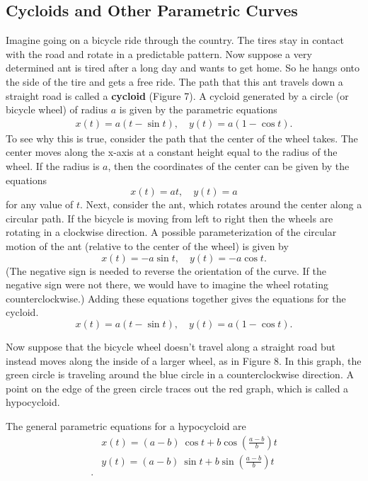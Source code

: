 \documentclass{report}
\begin{document}
    \subsection{Cycloids and Other Parametric Curves}
    \bigbreak \noindent 
    Imagine going on a bicycle ride through the country. The tires stay in contact with the road and rotate in a predictable pattern. Now suppose a very determined ant is tired after a long day and wants to get home. So he hangs onto the side of the tire and gets a free ride. The path that this ant travels down a straight road is called a \textbf{cycloid} (Figure 7). A cycloid generated by a circle (or bicycle wheel) of radius $a$ is given by the parametric equations
    \begin{align*}
        x(t) = a(t-\sin{t}), \quad y(t) = a(1-\cos{t})
    .\end{align*}
    \bigbreak \noindent 
    To see why this is true, consider the path that the center of the wheel takes. The center moves along the x-axis at a constant height equal to the radius of the wheel. If the radius is \( a \), then the coordinates of the center can be given by the equations
    \[
        x(t) = at, \quad y(t) = a
    \]
    for any value of \( t \). Next, consider the ant, which rotates around the center along a circular path. If the bicycle is moving from left to right then the wheels are rotating in a clockwise direction. A possible parameterization of the circular motion of the ant (relative to the center of the wheel) is given by
    \[
        x(t) = -a\sin t, \quad y(t) = -a\cos t.
    \]
    (The negative sign is needed to reverse the orientation of the curve. If the negative sign were not there, we would have to imagine the wheel rotating counterclockwise.) Adding these equations together gives the equations for the cycloid.
    \[
        x(t) = a(t - \sin t), \quad y(t) = a(1 - \cos t).
    \]
    \bigbreak \noindent 
    \bigbreak \noindent 
    \begin{minipage}[b]{0.47\textwidth}
        Now suppose that the bicycle wheel doesn’t travel along a straight road but instead moves along the inside of a larger wheel, as in Figure 8. In this graph, the green circle is traveling around the blue circle in a counterclockwise direction. A point on the edge of the green circle traces out the red graph, which is called a hypocycloid.
    \end{minipage}
    \hspace{.1in}
    \begin{minipage}[]{0.47\textwidth}
    \end{minipage}
    \bigbreak \noindent 
    The general parametric equations for a hypocycloid are
    \begin{align*}
        &x(t) = (a-b)\ \cos{t} + b \cos{\left(\frac{a-b}{b}\right)}t \\
        &y(t) = (a-b)\ \sin{t} + b \sin{\left(\frac{a-b}{b}\right)}t \\
    .\end{align*}
\end{document}
